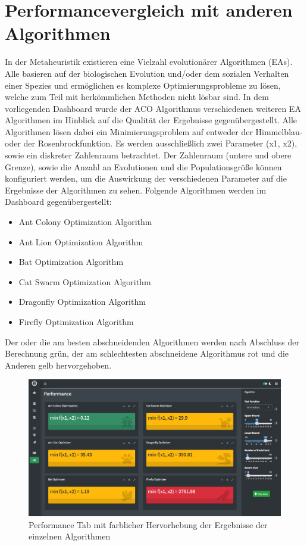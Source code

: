 \section{Performancevergleich mit anderen Algorithmen}\label{chap:Performance}

In der Metaheuristik existieren eine Vielzahl evolutionärer Algorithmen (EAs). Alle basieren auf der biologischen Evolution und/oder dem sozialen Verhalten einer Spezies und ermöglichen es komplexe Optimierungsprobleme zu lösen, welche zum Teil mit herkömmlichen Methoden nicht lösbar sind. \newline
In dem vorliegenden Dashboard wurde der ACO Algorithmus verschiedenen weiteren EA Algorithmen im Hinblick auf die Qualität der Ergebnisse gegenübergestellt. \newline 
Alle Algorithmen lösen dabei ein Minimierungsproblem auf entweder der Himmelblau- oder der Rosenbrockfunktion. Es werden ausschließlich zwei Parameter (x1, x2), sowie ein diskreter Zahlenraum betrachtet.\newline 
Der Zahlenraum (untere und obere Grenze), sowie die Anzahl an Evolutionen und die Populationsgröße können konfiguriert werden, um die Auswirkung der verschiedenen Parameter auf die Ergebnisse der Algorithmen zu sehen. \newline 
Folgende Algorithmen werden im Dashboard gegenübergestellt: 
\begin{itemize}
    \item Ant Colony Optimization Algorithm
    \item Ant Lion Optimization Algorithm 
    \item Bat Optimization Algorithm 
    \item Cat Swarm Optimization Algorithm
    \item Dragonfly Optimization Algorithm 
    \item Firefly Optimization Algorithm 
\end{itemize}
Der oder die am besten abschneidenden Algorithmen werden nach Abschluss der Berechnung grün, der am schlechtesten abschneidene Algorithmus rot und die Anderen gelb hervorgehoben.
\begin{figure}[H]
 \centering
 \includegraphics[scale=0.2]{"images/06_Performancevergleich/performance_tab.png"}
 \caption{Performance Tab mit farblicher Hervorhebung der Ergebnisse der einzelnen Algorithmen}
 \label{fig:performance_tab}
\end{figure}

